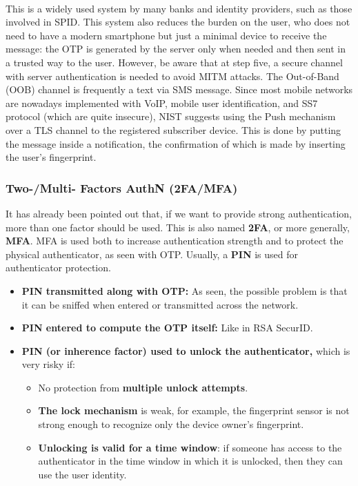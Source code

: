\paragraph{}
This is a widely used system by many banks and identity providers, such as those involved in SPID. This system also reduces the burden on the user, who does not need to have a modern smartphone but just a minimal device to receive the message: the OTP is generated by the server only when needed and then sent in a trusted way to the user. However, be aware that at step five, a secure channel with server authentication is needed to avoid MITM attacks. The Out-of-Band (OOB) channel is frequently a text via SMS message. Since most mobile networks are nowadays implemented with VoIP, mobile user identification, and SS7 protocol (which are quite insecure), NIST suggests using the Push mechanism over a TLS channel to the registered subscriber device. This is done by putting the message inside a notification, the confirmation of which is made by inserting the user's fingerprint.


\subsubsection{Two-/Multi- Factors AuthN (2FA/MFA)}
It has already been pointed out that, if we want to provide strong authentication, more than one factor should be used. This is also named \textbf{2FA}, or more generally, \textbf{MFA}. MFA is used both to increase authentication strength and to protect the physical authenticator, as seen with OTP. Usually, a \textbf{PIN} is used for authenticator protection.
\begin{itemize}
  \item \textbf{PIN transmitted along with OTP:} As seen, the possible problem is that it can be sniffed when entered or transmitted across the network.
  \item \textbf{PIN entered to compute the OTP itself:} Like in RSA SecurID.
  \item \textbf{PIN (or inherence factor) used to unlock the authenticator,} which is very risky if:
  \begin{itemize}
      \item No protection from \textbf{multiple unlock attempts}.
      \item \textbf{The lock mechanism} is weak, for example, the fingerprint sensor is not strong enough to recognize only the device owner's fingerprint.
      \item \textbf{Unlocking is valid for a time window}: if someone has access to the authenticator in the time window in which it is unlocked, then they can use the user identity.
  \end{itemize}
\end{itemize}

